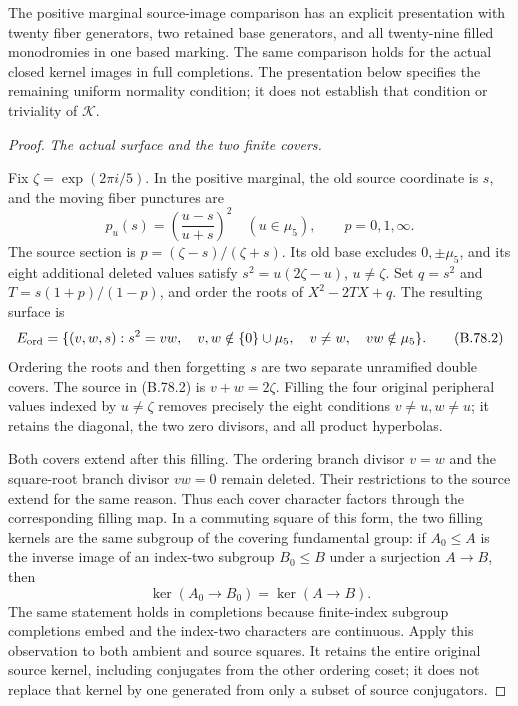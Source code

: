 The positive marginal source-image comparison has an explicit presentation
with twenty fiber generators, two retained base generators, and all
twenty-nine filled monodromies in one based marking. The same comparison
holds for the actual closed kernel images in full completions. The
presentation below specifies the remaining uniform normality condition;
it does not establish that condition or triviality of \(\mathcal K\).

\begin{proof}
\emph{The actual surface and the two finite covers.}\par
Fix \(\zeta=\exp(2\pi i/5)\). In the positive marginal, the old source
coordinate is \(s\), and the moving fiber punctures are
\[
 p_u(s)=\left(\frac{u-s}{u+s}\right)^2\quad(u\in\mu _5),
 \qquad p=0,1,\infty.
 \tag{B.78.1}
\]
The source section is \(p=(\zeta-s)/(\zeta+s)\). Its old base excludes
\(0,\pm\mu _5\), and its eight additional deleted values satisfy
\(s^2=u(2\zeta-u)\), \(u\ne\zeta\). Set
\(q=s^2\) and \(T=s(1+p)/(1-p)\), and order the roots of
\(X^2-2TX+q\). The resulting surface is
\[
 E_{\rm ord}=\{(v,w,s):s^2=vw,\quad
 v,w\notin\{0\}\cup\mu _5,\quad v\ne w,\quad vw\notin\mu _5\}.
 \tag{B.78.2}
\]
Ordering the roots and then forgetting \(s\) are two separate unramified
double covers. The source in (B.78.2) is \(v+w=2\zeta\).
Filling the four original peripheral values indexed by \(u\ne\zeta\)
removes precisely the eight conditions \(v\ne u,w\ne u\); it retains
the diagonal, the two zero divisors, and all product hyperbolas.

Both covers extend after this filling. The ordering branch divisor
\(v=w\) and the square-root branch divisor \(vw=0\) remain deleted.
Their restrictions to the source extend for the same reason. Thus each
cover character factors through the corresponding filling map. In a
commuting square of this form, the two filling kernels are the same
subgroup of the covering fundamental group: if \(A_0\leq A\) is the
inverse image of an index-two subgroup \(B_0\leq B\) under a surjection
\(A\to B\), then
\[
       \ker(A_0\longrightarrow B_0)=\ker(A\longrightarrow B).
 \tag{B.78.3}
\]
The same statement holds in completions because finite-index subgroup
completions embed and the index-two characters are continuous. Apply
this observation to both ambient and source squares. It retains the
entire original source kernel, including conjugates from the other
ordering coset; it does not replace that kernel by one generated from
only a subset of source conjugators.


\end{proof}

